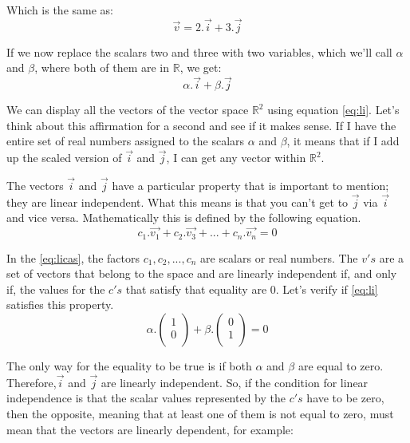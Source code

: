 \documentclass[a4,12pt,twosided,openany]{memoir}
\begin{document}
\par 
\indent
Which is the same as:
\[\overrightarrow{v} = 2.\overrightarrow{i} + 3.\overrightarrow{j}\]
\par 
\indent
If we now replace the scalars two and three with two variables, which we’ll call $\alpha$ and $\beta$, where both of them are in $\mathbb{R}$, we get:
\begin{equation}\label{eq:li}
\alpha.\overrightarrow{i} + \beta.\overrightarrow{j}
\end{equation} 
\par 
\indent
We can display all the vectors of the vector space $\mathbb{R}^2$ using equation \ref{eq:li}. Let’s think about this affirmation for a second and see if it makes sense. If I have the entire set of real numbers assigned to the scalars $\alpha$ and $\beta$, it means that if I add up the scaled version of $\overrightarrow{i}$ and $\overrightarrow{j}$, I can get any vector within $\mathbb{R}^2$. 
\par 
\indent
The vectors $\overrightarrow{i}$ and $\overrightarrow{j}$ have a particular property that is important to mention; they are linear independent. What this means is that you can’t get to $\overrightarrow{j}$ via $\overrightarrow{i}$ and vice versa. Mathematically this is defined by the following equation.
\begin{equation}
c_1.\overrightarrow{v_1} + c_2.\overrightarrow{v_3} + ... + c_n.\overrightarrow{v_n} = 0 \label{eq:licas}
\end{equation}
\par 
\indent
In the \ref{eq:licas}, the factors  $c_1, c_2, ..., c_n$ are scalars or real numbers. The $v's$ are a set of vectors that belong to the space and are linearly independent if, and only if, the values for the $c's$ that satisfy that equality are 0. Let’s verify if \ref{eq:li} satisfies this property.
\[\alpha.\begin{pmatrix}
1\\
0\\
\end{pmatrix} + \beta.\begin{pmatrix}
0\\
1\\
\end{pmatrix} = 0\]
\par 
\indent
The only way for the equality to be true is if both $\alpha$ and $\beta$ are equal to zero. Therefore,$\overrightarrow{i}$ and $\overrightarrow{j}$ are linearly independent. So, if the condition for linear independence is that the scalar values represented by the $c's$ have to be zero, then the opposite, meaning that at least one of them is not equal to zero, must mean that the vectors are linearly dependent, for example:
\end{document}
